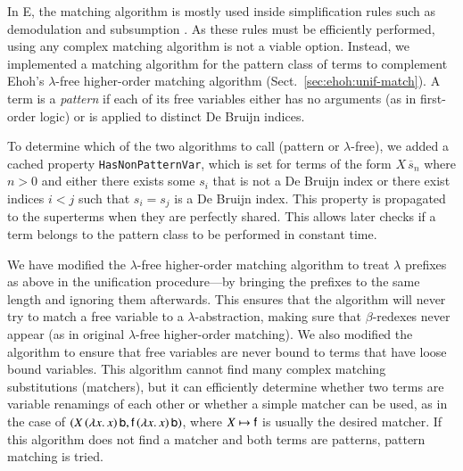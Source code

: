In E, the matching algorithm is mostly used inside
simplification rules such as demodulation and subsumption \cite{ss-02-brainiac}.
As these rules must be efficiently performed, using any complex matching
algorithm is not a viable option. Instead, we implemented a matching algorithm
for the pattern class of terms \cite{tn-93-patterns} to complement Ehoh's
$\lambda$-free higher-order matching algorithm (Sect.~\ref{sec:ehoh:unif-match}).
A term is a \emph{pattern} if each of its free variables either
has no arguments (as in first-order logic) or is applied to distinct De Bruijn
indices.

To determine which of the two algorithms to call (pattern or $\lambda$-free), we
added a cached property \texttt{HasNonPatternVar}, which is set for terms of the
form $X \,
\overline{s}_n$ where $n>0$ and either there exists some $s_i$ that is not a De Bruijn
index or there exist indices $i < j$ such that $s_i = s_j$ is
a De Bruijn index. This property is propagated to the superterms when they are
perfectly shared. This allows later checks if a term belongs to the pattern
class to be performed in constant time.


We have modified the $\lambda$-free higher-order matching algorithm to treat
$\lambda$ prefixes as above in the unification procedure---by bringing the prefixes
to the same length and ignoring them afterwards. This ensures that the
algorithm will never try to match a free variable to a $\lambda$-abstraction,
making sure that $\beta$-redexes never appear (as in original $\lambda$-free
higher-order matching). We also modified the algorithm to ensure that free variables
are never bound to terms that have loose bound variables. This algorithm cannot
find many complex matching substitutions (matchers), but it can
efficiently determine whether two terms are variable renamings of each other
or whether a simple matcher can be used, as in the case of $(X \, (\lambda x. \,x) \,
\mathsf{b}, \mathsf{f} \, (\lambda x. \,x) \, \mathsf{b})$, where ${X \mapsto \mathsf{f}}$ is
usually the desired matcher. If this algorithm does not find a matcher and both
terms are patterns, pattern matching is tried.


